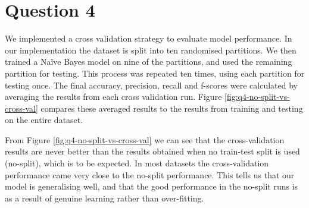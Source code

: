 \documentclass[11pt]{article}
\begin{document}
    \section*{Question 4}
    We implemented a cross validation strategy to evaluate model performance. In our implementation the dataset is split into ten randomised partitions. We then trained a Na\"{i}ve Bayes model on nine of the partitions, and used the remaining partition for testing. This process was repeated ten times, using each partition for testing once. The final accuracy, precision, recall and f-scores were calculated by averaging the results from each cross validation run. Figure \ref{fig:q4-no-split-vs-cross-val} compares these averaged results to the results from training and testing on the entire dataset.

    From Figure \ref{fig:q4-no-split-vs-cross-val} we can see that the cross-validation results are never better than the results obtained when no train-test split is used (no-split), which is to be expected. In most datasets the cross-validation performance came very close to the no-split performance. This tells us that our model is generalising well, and that the good performance in the no-split runs is as a result of genuine learning rather than over-fitting.
\end{document}
